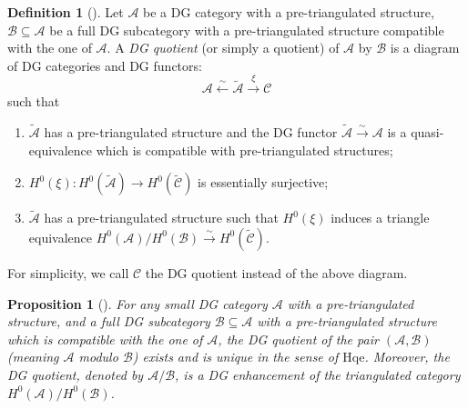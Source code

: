 \documentclass[11pt,reqno]{amsart}
\newtheorem{proposition}[theorem]{Proposition}
\theoremstyle{definition}
\newtheorem{definition}[theorem]{Definition}
\begin{document}
\begin{definition}[{\cite[1.2]{DRI}}]\label{sfkd}
Let $\mathcal{A}$ be a DG category with a pre-triangulated structure, $\mathcal{B} \subseteq \mathcal{A}$ be a 
full DG  subcategory with a pre-triangulated structure compatible with the one of $\mathcal{A}$. 
A {\it DG quotient} (or simply a quotient) of $\mathcal{A}$
by
$\mathcal{B}$ is a diagram of DG 
categories and DG functors:
$$
\mathcal{A} \xleftarrow{\sim} \tilde{\mathcal{A}} \xrightarrow{\xi} \mathcal{C}
$$
such that
\begin{enumerate}
\item[(1)] $\tilde{\mathcal{A}}$ has a pre-triangulated structure 
and the DG functor $\tilde{\mathcal{A}} \xrightarrow{\sim} \mathcal{A}$ 
is a quasi-equivalence which is compatible with pre-triangulated structures; 

\item[(2)] $H^0(\xi): H^0(\tilde{\mathcal{A}}) 
\rightarrow H^0(\tilde{\mathcal{C}})$ is essentially surjective; 

\item[(3)] $\tilde{\mathcal{A}}$ has a pre-triangulated structure 
such that $H^{0}(\xi)$ induces a triangle equivalence 
$H^0(\mathcal{A}) / H^0(\mathcal{B}) \xrightarrow{\sim} H^0(\tilde{\mathcal{C}})$. 
\end{enumerate}
\end{definition}

For simplicity, we call $\mathcal{C}$ the DG quotient instead of the above diagram.  
 
\begin{proposition}[{\cite[1.6.2]{DRI}}]\label{nskkx}
For any small DG category $\mathcal{A}$ with a pre-triangulated structure, and 
a full DG subcategory $\mathcal{B} \subseteq \mathcal{A}$ with 
a pre-triangulated structure which is compatible with the one of $\mathcal{A}$, the DG quotient 
of the pair $(\mathcal{A}, \mathcal{B})$ (meaning $\mathcal{A}$
modulo $\mathcal{B}$) exists and is unique in the 
sense of $\mathrm{Hqe}$. Moreover, the DG quotient, denoted by $\mathcal{A}/\mathcal{B}$, 
is a DG enhancement of the 
triangulated category $H^{0}(\mathcal{A})/H^{0}(\mathcal{B})$. 
\end{proposition}
\end{document}
